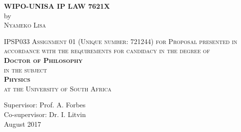 \begin{center}


\long{}
\Large \textbf{WIPO-UNISA IP LAW 7621X}\\[1.0cm]
\normalsize{by}\\[1.0cm]
\textsc{\large Nyameko Lisa}\\[0.5cm]


\addvspace{140pt}

\textsc{\normalsize\vspace{4.0cm} IPSP033 Assignment 01 (Unique number: 721244) for Proposal presented in accordance with the
  requirements for candidacy in the degree of\\[0.75cm]\textbf{Doctor of
    Philosophy}\\[0.75cm] in the subject\\[0.75cm]\textbf{Physics}\\[0.75cm] at
  the University of South Africa}
\vfill{}

	\small Supervisor: Prof. A. Forbes\\
	\small \hspace{0.975mm}Co-supervisor: Dr. I. Litvin\\

\addvspace{30pt}
\small August 2017\\

\addvspace{30pt}
\small {}

\end{center}
